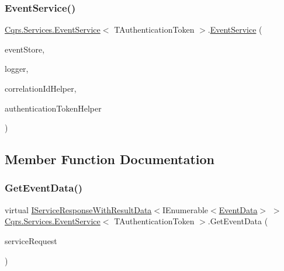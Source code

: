 \subsubsection{\texorpdfstring{Event\+Service()}{EventService()}}
{\footnotesize\ttfamily \hyperlink{classCqrs_1_1Services_1_1EventService}{Cqrs.\+Services.\+Event\+Service}$<$ T\+Authentication\+Token $>$.\hyperlink{classCqrs_1_1Services_1_1EventService}{Event\+Service} (\begin{DoxyParamCaption}\item[{\hyperlink{interfaceCqrs_1_1Events_1_1IEventStore}{I\+Event\+Store}$<$ T\+Authentication\+Token $>$}]{event\+Store,  }\item[{I\+Logger}]{logger,  }\item[{I\+Correlation\+Id\+Helper}]{correlation\+Id\+Helper,  }\item[{\hyperlink{interfaceCqrs_1_1Authentication_1_1IAuthenticationTokenHelper}{I\+Authentication\+Token\+Helper}$<$ T\+Authentication\+Token $>$}]{authentication\+Token\+Helper }\end{DoxyParamCaption})\hspace{0.3cm}{\ttfamily [protected]}}



\subsection{Member Function Documentation}
\mbox{\label{classCqrs_1_1Services_1_1EventService_a9a68d774ac754e39be56d3e0449f14d7_a9a68d774ac754e39be56d3e0449f14d7}} 
\subsubsection{\texorpdfstring{Get\+Event\+Data()}{GetEventData()}}
{\footnotesize\ttfamily virtual \hyperlink{interfaceCqrs_1_1Services_1_1IServiceResponseWithResultData}{I\+Service\+Response\+With\+Result\+Data}$<$I\+Enumerable$<$\hyperlink{classCqrs_1_1Events_1_1EventData}{Event\+Data}$>$ $>$ \hyperlink{classCqrs_1_1Services_1_1EventService}{Cqrs.\+Services.\+Event\+Service}$<$ T\+Authentication\+Token $>$.Get\+Event\+Data (\begin{DoxyParamCaption}\item[{\hyperlink{interfaceCqrs_1_1Services_1_1IServiceRequestWithData}{I\+Service\+Request\+With\+Data}$<$ T\+Authentication\+Token, Guid $>$}]{service\+Request }\end{DoxyParamCaption})\hspace{0.3cm}{\ttfamily [virtual]}}



